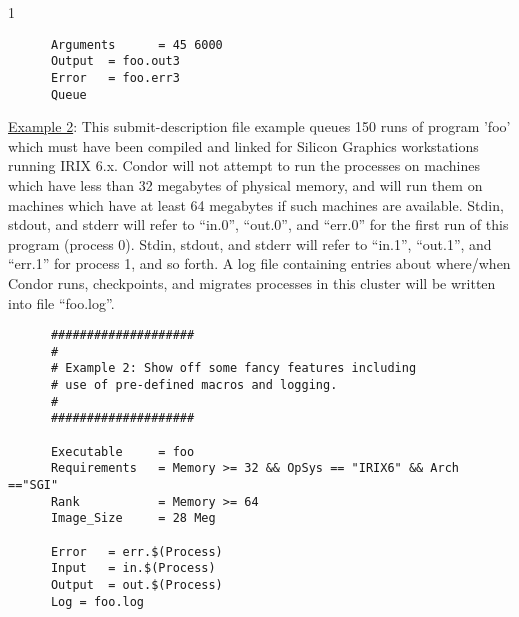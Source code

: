 \begin{ManPage}{\label{man-condor-submit}}{1}
\begin{verbatim}
      Arguments      = 45 6000                                               
      Output  = foo.out3                                                     
      Error   = foo.err3
      Queue                   
\end{verbatim}

\underline{Example 2}: This submit-description file example queues 150
runs of program 'foo' which must have been compiled and linked for
Silicon Graphics workstations running IRIX 6.x. Condor will not attempt
to run the processes on machines which have less than 32 megabytes of
physical memory, and will run them on machines which have at least 64
megabytes if such machines are available. Stdin, stdout, and stderr will
refer to ``in.0'', ``out.0'', and ``err.0'' for the first run of this program
(process 0). Stdin, stdout, and stderr will refer to ``in.1'', ``out.1'',
and ``err.1'' for process 1, and so forth. A log file containing entries
about where/when Condor runs, checkpoints, and migrates processes in this
cluster will be written into file ``foo.log''.

\begin{verbatim}
      ####################                                                    
      #                                                                       
      # Example 2: Show off some fancy features including                            
      # use of pre-defined macros and logging.                                
      #                                                                       
      ####################                                                    
                                                                          
      Executable     = foo                                                    
      Requirements   = Memory >= 32 && OpSys == "IRIX6" && Arch =="SGI"     
      Rank           = Memory >= 64
      Image_Size     = 28 Meg                                                 
                                                                          
      Error   = err.$(Process)                                                
      Input   = in.$(Process)                                                 
      Output  = out.$(Process)                                                
      Log = foo.log                                                                       
                                                                          

\end{verbatim}
\end{ManPage}
